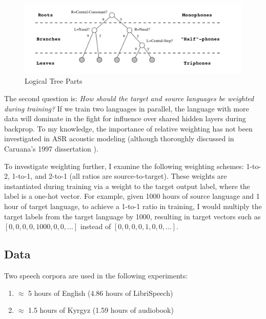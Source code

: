 \documentclass[a4paper]{article}
\begin{document}
\begin{figure}[!htbp]
  \centering
{}
  \includegraphics[width=\linewidth]{figs-1/levels.png}
  \caption{Logical Tree Parts}
  \label{fig:tree-parts}
\endminipage\hfill
\end{figure}



The second question is: \textit{How should the target and source languages be weighted during training?} If we train two languages in parallel, the language with more data will dominate in the fight for influence over shared hidden layers during backprop. To my knowledge, the importance of relative weighting has not been investigated in ASR acoustic modeling (although thoroughly discussed in Caruana's 1997 dissertation \cite{caruana1997}).

To investigate weighting further, I examine the following weighting schemes: 1-to-2, 1-to-1, and 2-to-1 (all ratios are source-to-target). These weights are instantiated during training via a weight to the target output label, where the label is a one-hot vector. For example, given 1000 hours of source language and 1 hour of target language, to achieve a 1-to-1 ratio in training, I would multiply the target labels from the target language by 1000, resulting in target vectors such as \texttt{$[0, 0, 0, 0, 1000, 0, 0, \ldots]$} instead of \texttt{$[0, 0, 0, 0, 1, 0, 0, \ldots]$}.



\subsection{Data}

Two speech corpora are used in the following experiments:

\begin{enumerate}
\item $\approx$ 5 hours of English (4.86 hours of LibriSpeech)
\item $\approx$ 1.5 hours of Kyrgyz (1.59 hours of audiobook)
\end{enumerate}
\end{document}
